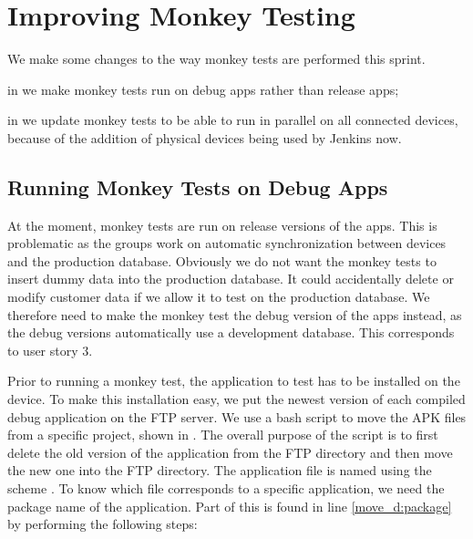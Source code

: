 \chapter{Improving Monkey Testing}
We make some changes to the way monkey tests are performed this sprint.

\begin{chapterorganization}
  \item in  we make monkey tests run on debug apps rather than release apps;
  \item in  we update monkey tests to be able to run in parallel on all connected devices, because of the addition of physical devices being used by Jenkins now.
\end{chapterorganization}

\section{Running Monkey Tests on Debug Apps}\label{sec:monkey_test_debug_app}
At the moment, monkey tests are run on release versions of the apps. This is problematic as the \db{} groups work on automatic synchronization between devices and the production database. Obviously we do not want the monkey tests to insert dummy data into the production database. It could accidentally delete or modify customer data if we allow it to test on the production database. We therefore need to make the monkey test the debug version of the apps instead, as the debug versions automatically use a development database. This corresponds to user story 3.

Prior to running a monkey test, the application to test has to be installed on the device. To make this installation easy, we put the newest version of each compiled debug application on the FTP server. We use a bash script to move the APK files from a specific project, shown in . The overall purpose of the script is to first delete the old version of the application from the FTP directory and then move the new one into the FTP directory. The application file is named using the scheme . To know which file corresponds to a specific application, we need the package name of the application. Part of this is found in line \ref{move_d:package} by performing the following steps:

